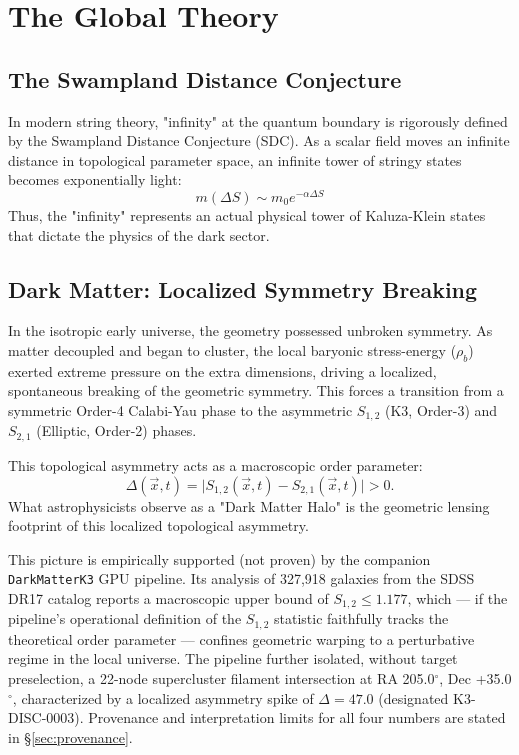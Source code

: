 \documentclass[aps,prd,twocolumn,nofootinbib,superscriptaddress,10pt]{revtex4-2}
\begin{document}
\section{The Global Theory}

\subsection{The Swampland Distance Conjecture}
In modern string theory, "infinity" at the quantum boundary is rigorously defined by the Swampland Distance Conjecture (SDC). As a scalar field moves an infinite distance in topological parameter space, an infinite tower of stringy states becomes exponentially light:
\begin{equation}
    m(\Delta S) \sim m_0 e^{-\alpha \Delta S}
\end{equation}
Thus, the "infinity" represents an actual physical tower of Kaluza-Klein states that dictate the physics of the dark sector.

\subsection{Dark Matter: Localized Symmetry Breaking}
In the isotropic early universe, the geometry possessed unbroken symmetry. As matter decoupled and began to cluster, the local baryonic stress-energy ($\rho_b$) exerted extreme pressure on the extra dimensions, driving a localized, spontaneous breaking of the geometric symmetry. This forces a transition from a symmetric Order-4 Calabi-Yau phase to the asymmetric $S_{1,2}$ (K3, Order-3) and $S_{2,1}$ (Elliptic, Order-2) phases.

This topological asymmetry acts as a macroscopic order parameter:
\begin{equation}
    \Delta(\vec{x}, t) = \big| S_{1,2}(\vec{x}, t) - S_{2,1}(\vec{x}, t) \big| > 0.
\end{equation}
What astrophysicists observe as a "Dark Matter Halo" is the geometric lensing footprint of this localized topological asymmetry. 

This picture is empirically supported (not proven) by the companion \texttt{DarkMatterK3} GPU pipeline. Its analysis of 327,918 galaxies from the SDSS DR17 catalog reports a macroscopic upper bound of $S_{1,2} \le 1.177$, which --- if the pipeline's operational definition of the $S_{1,2}$ statistic faithfully tracks the theoretical order parameter --- confines geometric warping to a perturbative regime in the local universe. The pipeline further isolated, without target preselection, a 22-node supercluster filament intersection at RA 205.0$^\circ$, Dec +35.0$^\circ$, characterized by a localized asymmetry spike of $\Delta = 47.0$ (designated K3-DISC-0003). Provenance and interpretation limits for all four numbers are stated in \S\ref{sec:provenance}.
\end{document}
